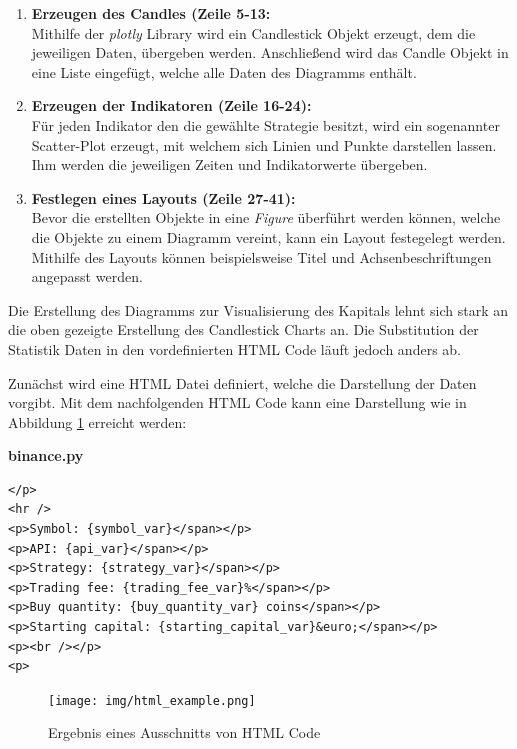 \documentclass[oneside]{ausarbeitung}
\begin{document}
\begin{enumerate}
	\item \textbf{Erzeugen des Candles (Zeile 5-13:} \\
		Mithilfe der \textit{plotly} Library wird ein Candlestick Objekt erzeugt,
		dem die jeweiligen Daten, übergeben werden. Anschließend wird das Candle
		Objekt in eine Liste eingefügt, welche alle Daten des Diagramms enthält.
	\item \textbf{Erzeugen der Indikatoren (Zeile 16-24):} \\
		Für jeden Indikator den die gewählte Strategie besitzt, wird ein 
		sogenannter Scatter-Plot erzeugt, mit welchem sich Linien und Punkte
		darstellen lassen. Ihm werden die jeweiligen Zeiten und Indikatorwerte
		übergeben.
	\item \textbf{Festlegen eines Layouts (Zeile 27-41):} \\
		Bevor die erstellten Objekte in eine \textit{Figure} überführt werden
		können, welche die Objekte zu einem Diagramm vereint, kann ein Layout
		festegelegt werden. Mithilfe des Layouts können beispielsweise Titel und
		Achsenbeschriftungen angepasst werden.
\end{enumerate}

Die Erstellung des Diagramms zur Visualisierung des Kapitals lehnt sich stark an die oben gezeigte Erstellung des Candlestick Charts an. Die Substitution der Statistik Daten in den vordefinierten HTML Code läuft jedoch anders ab.

Zunächst wird eine HTML Datei definiert, welche die Darstellung der Daten vorgibt.
Mit dem nachfolgenden HTML Code kann eine Darstellung wie in Abbildung \ref{fig:19} erreicht werden:

\lstset{language=HTML}
\lstset{frame=lines}
\lstset{basicstyle=\footnotesize}
\textbf{binance.py}
\begin{lstlisting}
</p>
<hr />
<p>Symbol: {symbol_var}</span></p>
<p>API: {api_var}</span></p>
<p>Strategy: {strategy_var}</span></p>
<p>Trading fee: {trading_fee_var}%</span></p>
<p>Buy quantity: {buy_quantity_var} coins</span></p>
<p>Starting capital: {starting_capital_var}&euro;</span></p>
<p><br /></p>
<p>
\end{lstlisting}

\begin{figure}[H]
  \centering
  \texttt{[image: img/html\_example.png]}
  \caption{Ergebnis eines Ausschnitts von HTML Code}
  \label{fig:19}
\end{figure}
\end{document}
